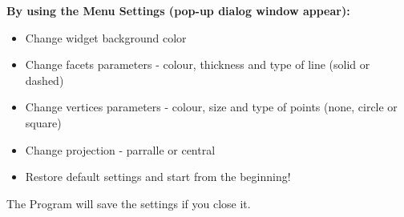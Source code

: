 \documentclass[12pt, a4paper]{article}
\begin{document}
\bigskip

\textbf{By using the Menu Settings (pop-up dialog window appear):}
\begin{itemize}
    \item Change widget background color
    \item Change facets parameters - colour, thickness and type of line (solid or dashed)
    \item Change vertices parameters - colour, size and type of points (none, circle or square)
    \item Change projection - parralle or central
    \item Restore default settings and start from the beginning!
\end{itemize}

\bigskip

The Program will save the settings if you close it.
\end{document}
